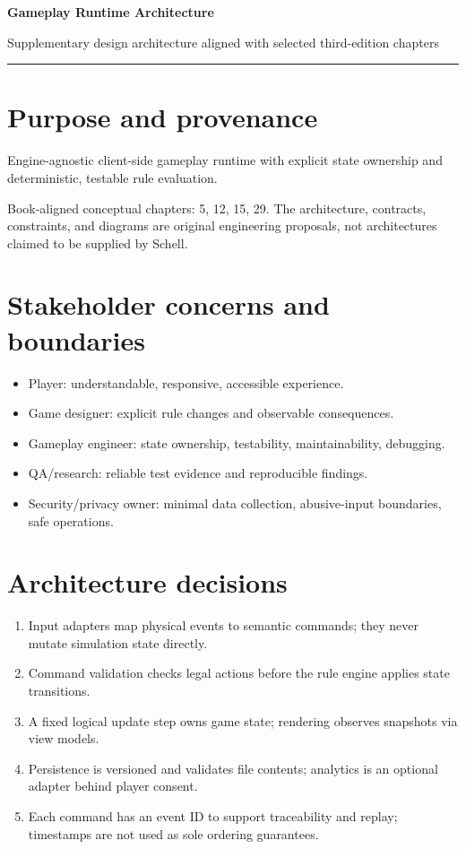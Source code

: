 \documentclass[11pt]{article}
\begin{document}
{\huge\bfseries\color{suiteblue} Gameplay Runtime Architecture}\par
\vspace{0.15in}
{\normalsize\color{suitegray} Supplementary design architecture aligned with selected third-edition chapters}\par
\vspace{0.15in}\hrule\vspace{0.15in}

\section{Purpose and provenance}
Engine-agnostic client-side gameplay runtime with explicit state ownership and deterministic, testable rule evaluation.

Book-aligned conceptual chapters: 5, 12, 15, 29. The architecture, contracts, constraints, and diagrams are original engineering proposals, not architectures claimed to be supplied by Schell.


\section{Stakeholder concerns and boundaries}
\begin{itemize}
\item Player: understandable, responsive, accessible experience.
\item Game designer: explicit rule changes and observable consequences.
\item Gameplay engineer: state ownership, testability, maintainability, debugging.
\item QA/research: reliable test evidence and reproducible findings.
\item Security/privacy owner: minimal data collection, abusive-input boundaries, safe operations.
\end{itemize}

\section{Architecture decisions}
\begin{enumerate}
\item Input adapters map physical events to semantic commands; they never mutate simulation state directly.
\item Command validation checks legal actions before the rule engine applies state transitions.
\item A fixed logical update step owns game state; rendering observes snapshots via view models.
\item Persistence is versioned and validates file contents; analytics is an optional adapter behind player consent.
\item Each command has an event ID to support traceability and replay; timestamps are not used as sole ordering guarantees.
\end{enumerate}
\end{document}

